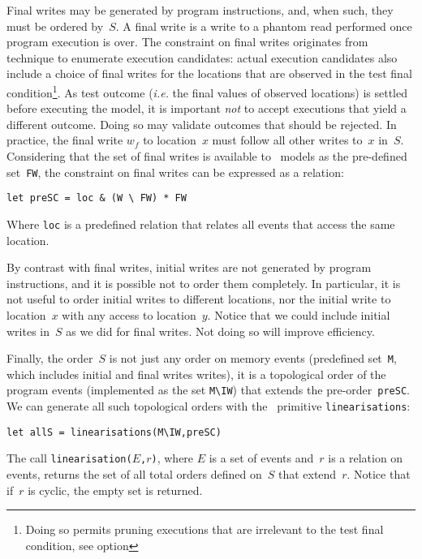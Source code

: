 Final writes may be  generated by program instructions, and, when such,
they must be ordered by~$S$.
A final write is a write to a phantom read performed once
program execution is over.
The constraint on final writes
originates from \herd{} technique to enumerate execution candidates:
actual execution candidates also include a choice of final writes for
the locations that are observed in the test final condition\footnote{Doing
so permits pruning executions that are irrelevant to the test final condition,
see \herd{} option }.
As test outcome (\emph{i.e.} the final values of observed locations) is
settled before executing the model, it is important \emph{not} to accept
executions that yield a different outcome. Doing so may validate outcomes
that should be rejected.
In practice, the final write $w_f$
to location~$x$ must follow all other writes to~$x$ in~$S$.
Considering that the set of final writes is available to \cat{}~models
as the pre-defined set~\verb+FW+,
the  constraint on final writes
can be expressed as a relation:
\begin{verbatim}
let preSC = loc & (W \ FW) * FW
\end{verbatim}
Where \verb+loc+ is a predefined relation that relates all events
that access the same location.

By contrast with final writes, initial writes are not generated
by program instructions, and it is possible not to order them completely.
In particular, it is not useful to order initial writes to different locations,
nor the initial write to location~$x$ with any access to location~$y$.
Notice that we could include initial writes in~$S$ as we did for
final writes. Not doing so will improve efficiency.

\label{intro:linearisations}%
Finally, the order~$S$ is not just any order on memory events (predefined
set~\verb+M+, which includes initial and final writes writes),
it is a topological order of the program events (implemented as the set
\verb+M\IW+) that extends the pre-order~\verb+preSC+.
We can generate all such topological orders with the \cat{}~primitive
\verb+linearisations+:
\begin{verbatim}
let allS = linearisations(M\IW,preSC)
\end{verbatim}
The call \texttt{linearisation($E$,$r$)}, where $E$ is a set of events
and~$r$ is a relation on events, returns the set of all total
orders defined on~$S$ that extend~$r$. Notice that if~$r$ is cyclic,
the empty set is  returned.

